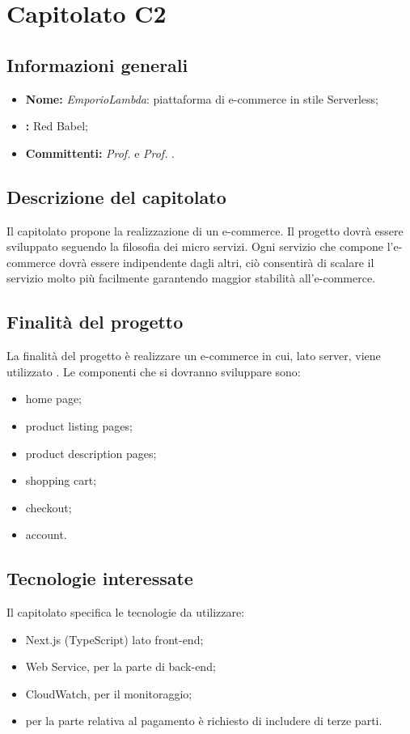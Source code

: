 \section{Capitolato C2}

\subsection{Informazioni generali}
\begin{itemize}
\item \textbf{Nome:} \textit{EmporioLambda}:  piattaforma di e-commerce in stile Serverless;
\item \textbf{:} Red Babel;
\item \textbf{Committenti:} \textit{Prof. \Tullio{}} e \textit{Prof. \Riccardo{}}.
\end{itemize}

\subsection{Descrizione del capitolato}
Il capitolato propone la realizzazione di un e-commerce. Il progetto dovrà essere sviluppato seguendo la filosofia dei micro servizi. Ogni servizio che compone l'e-commerce dovrà essere indipendente dagli altri, ciò consentirà di scalare il servizio molto più facilmente garantendo maggior stabilità all'e-commerce.

\subsection{Finalità del progetto}
La finalità del progetto è realizzare un e-commerce in cui, lato server, viene utilizzato . Le componenti che si dovranno sviluppare sono:
\begin{itemize}
\item home page;
\item product listing pages;
\item product description pages;
\item shopping cart;
\item checkout;
\item account.
\end{itemize}

\subsection{Tecnologie interessate}
Il capitolato specifica le tecnologie da utilizzare:
\begin{itemize}
\item Next.js (TypeScript) lato front-end;
\item {} Web Service, per la parte di back-end;
\item {} CloudWatch, per il monitoraggio;
\item per la parte relativa al pagamento è richiesto di includere  di terze parti.
\end{itemize}

